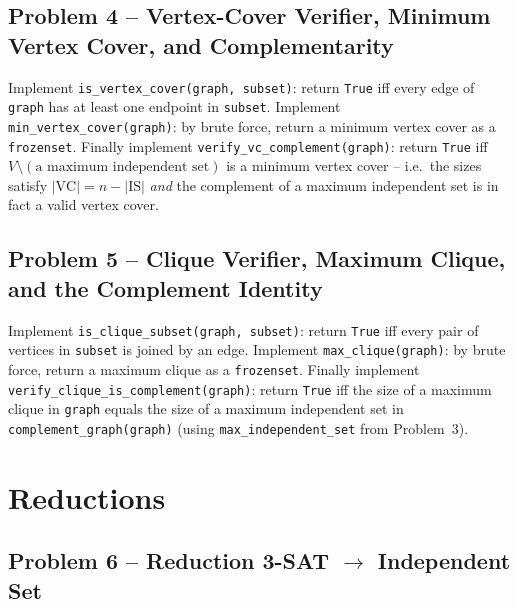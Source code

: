 \documentclass[11pt]{article}
\begin{document}
\subsection*{Problem 4 -- Vertex-Cover Verifier, Minimum Vertex Cover, and Complementarity}

Implement \texttt{is\_vertex\_cover(graph, subset)}: return \texttt{True} iff every edge of
\texttt{graph} has at least one endpoint in \texttt{subset}. Implement
\texttt{min\_vertex\_cover(graph)}: by brute force, return a minimum vertex cover as a
\texttt{frozenset}. Finally implement \texttt{verify\_vc\_complement(graph)}: return
\texttt{True} iff $V \setminus (\text{a maximum independent set})$ is a minimum vertex cover
-- i.e.\ the sizes satisfy $|\mathrm{VC}| = n - |\mathrm{IS}|$ \emph{and} the complement of a
maximum independent set is in fact a valid vertex cover.

\subsection*{Problem 5 -- Clique Verifier, Maximum Clique, and the Complement Identity}

Implement \texttt{is\_clique\_subset(graph, subset)}: return \texttt{True} iff every pair of
vertices in \texttt{subset} is joined by an edge. Implement
\texttt{max\_clique(graph)}: by brute force, return a maximum clique as a \texttt{frozenset}.
Finally implement \texttt{verify\_clique\_is\_complement(graph)}: return \texttt{True} iff
the size of a maximum clique in \texttt{graph} equals the size of a maximum independent set
in \texttt{complement\_graph(graph)} (using \texttt{max\_independent\_set} from Problem~3).

\newpage
\section{Reductions}

\subsection*{Problem 6 -- Reduction \textsc{3-SAT} \texorpdfstring{$\to$}{->} Independent Set}
\end{document}
